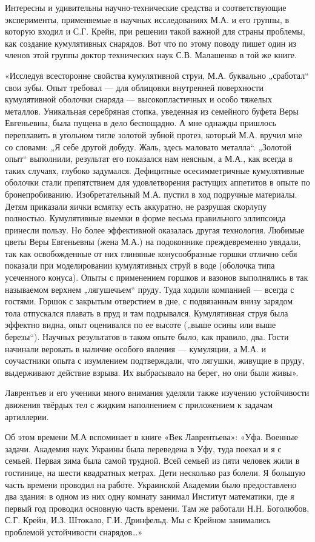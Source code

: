 Интересны и удивительны научно-технические средства и соответствующие эксперименты, применяемые в научных исследованиях М.А. и его группы, в которую входил и С.Г.  Крейн, при решении такой важной для страны проблемы, как создание кумулятивных снарядов.  Вот что по этому поводу пишет один из членов этой группы доктор технических наук С.В. Малашенко в той же книге.

«Исследуя всесторонне свойства кумулятивной струи, М.А. буквально „сработал“ свои зубы. Опыт требовал — для облицовки внутренней поверхности кумулятивной оболочки снаряда — высокопластичных и особо тяжелых металлов. Уникальная серебряная стопка, уведенная из семейного буфета Веры Евгеньевны, была пущена в дело беспощадно. А мне однажды пришлось переплавить в угольном тигле золотой зубной протез, который М.А. вручил мне со словами: „Я себе другой добуду. Жаль, здесь маловато металла“. „Золотой опыт“ выполнили, результат его показался нам неясным, а М.А., как всегда в таких случаях, глубоко задумался. Дефицитные осесимметричные кумулятивные оболочки стали препятствием для удовлетворения растущих аппетитов в опыте по бронепробиванию. Изобретательный М.А. пустил в ход подручные материалы. Детям приказали яички всмятку есть аккуратно, не разрушая скорлупу полностью. Кумулятивные выемки в форме весьма правильного эллипсоида принесли пользу. Но более эффективной оказалась другая технология. Любимые цветы Веры Евгеньевны (жена М.А.) на подоконнике преждевременно увядали, так как освобожденные от них глиняные конусообразные горшки отлично себя показали при моделировании кумулятивных струй в воде (оболочка типа усеченного конуса). Опыты с применением горшков и вазонов выполнялись в так называемом верхнем „лягушечьем“ пруду. Туда ходили компанией — всегда с гостями. Горшок с закрытым отверстием в дне, с подвязанным внизу зарядом тола отпускался плавать в пруд и там подрывался. Кумулятивная струя была эффектно видна, опыт оценивался по ее высоте („выше осины или выше березы“). Научных результатов в таком опыте было, как правило, два. Гости начинали веровать в наличие особого явления — кумуляции, а М.А. и соучастники опыта с изумлением подтверждали, что лягушки, живущие в пруду, выдерживают действие взрыва. Их выбрасывало на берег, но они были живы».

Лаврентьев и его ученики много внимания уделяли также изучению устойчивости движения твёрдых тел с жидким наполнением с приложением к задачам артиллерии.

Об этом времени М.А вспоминает в книге «Век Лаврентьева»: «Уфа. Военные задачи. Академия наук Украины была переведена в Уфу, туда поехал и я с семьей. Первая зима была самой трудной. Всей семьей из пяти человек жили в гостинице, на шести квадратных метрах. Дети несколько раз болели. Я большую часть времени проводил на работе. Украинской Академии было предоставлено два здания: в одном из них одну комнату занимал Институт математики, где я первый год проводил основную часть времени. Там же работали Н.Н. Боголюбов, С.Г. Крейн, И.З. Штокало, Г.И. Дринфельд. Мы с Крейном занимались проблемой устойчивости снарядов…»



